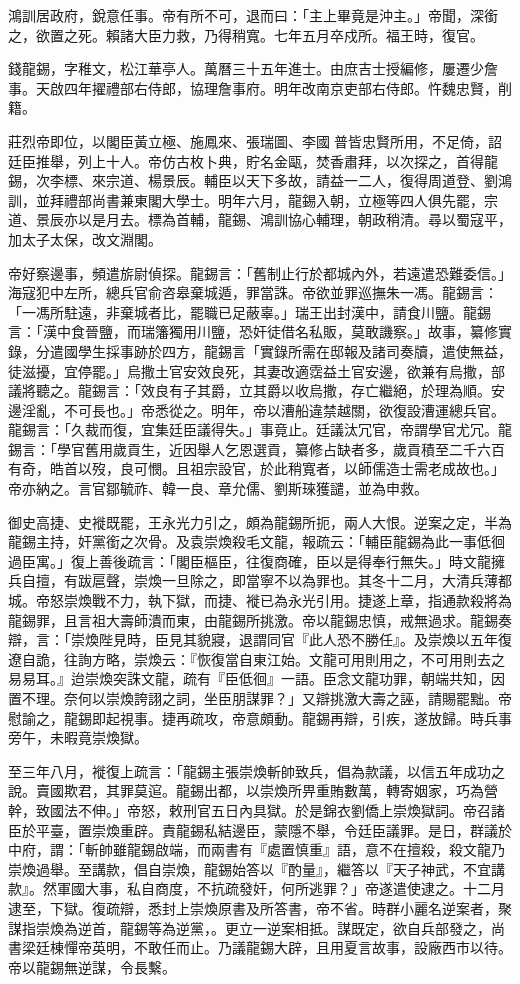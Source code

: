 \begin{pinyinscope}
鴻訓居政府，銳意任事。帝有所不可，退而曰：「主上畢竟是沖主。」帝聞，深銜之，欲置之死。賴諸大臣力救，乃得稍寬。七年五月卒戍所。福王時，復官。

錢龍錫，字稚文，松江華亭人。萬曆三十五年進士。由庶吉士授編修，屢遷少詹事。天啟四年擢禮部右侍郎，協理詹事府。明年改南京吏部右侍郎。忤魏忠賢，削籍。

莊烈帝即位，以閣臣黃立極、施鳳來、張瑞圖、李國普皆忠賢所用，不足倚，詔廷臣推舉，列上十人。帝仿古枚卜典，貯名金甌，焚香肅拜，以次探之，首得龍錫，次李標、來宗道、楊景辰。輔臣以天下多故，請益一二人，復得周道登、劉鴻訓，並拜禮部尚書兼東閣大學士。明年六月，龍錫入朝，立極等四人俱先罷，宗道、景辰亦以是月去。標為首輔，龍錫、鴻訓協心輔理，朝政稍清。尋以蜀寇平，加太子太保，改文淵閣。

帝好察邊事，頻遣旂尉偵探。龍錫言：「舊制止行於都城內外，若遠遣恐難委信。」海寇犯中左所，總兵官俞咨皋棄城遁，罪當誅。帝欲並罪巡撫朱一馮。龍錫言：「一馮所駐遠，非棄城者比，罷職已足蔽辜。」瑞王出封漢中，請食川鹽。龍錫言：「漢中食晉鹽，而瑞籓獨用川鹽，恐奸徒借名私販，莫敢譏察。」故事，纂修實錄，分遣國學生採事跡於四方，龍錫言「實錄所需在邸報及諸司奏牘，遣使無益，徒滋擾，宜停罷。」烏撒土官安效良死，其妻改適霑益土官安邊，欲兼有烏撒，部議將聽之。龍錫言：「效良有子其爵，立其爵以收烏撒，存亡繼絕，於理為順。安邊淫亂，不可長也。」帝悉從之。明年，帝以漕船違禁越關，欲復設漕運總兵官。龍錫言：「久裁而復，宜集廷臣議得失。」事竟止。廷議汰冗官，帝謂學官尤冗。龍錫言：「學官舊用歲貢生，近因舉人乞恩選貢，纂修占缺者多，歲貢積至二千六百有奇，皓首以歿，良可憫。且祖宗設官，於此稍寬者，以師儒造士需老成故也。」帝亦納之。言官鄒毓祚、韓一良、章允儒、劉斯琜獲譴，並為申救。

御史高捷、史褷既罷，王永光力引之，頗為龍錫所扼，兩人大恨。逆案之定，半為龍錫主持，奸黨銜之次骨。及袁崇煥殺毛文龍，報疏云：「輔臣龍錫為此一事低徊過臣寓。」復上善後疏言：「閣臣樞臣，往復商確，臣以是得奉行無失。」時文龍擁兵自擅，有跋扈聲，崇煥一旦除之，即當寧不以為罪也。其冬十二月，大清兵薄都城。帝怒崇煥戰不力，執下獄，而捷、褷已為永光引用。捷遂上章，指通款殺將為龍錫罪，且言祖大壽師潰而東，由龍錫所挑激。帝以龍錫忠慎，戒無過求。龍錫奏辯，言：「崇煥陛見時，臣見其貌寢，退謂同官『此人恐不勝任』。及崇煥以五年復遼自詭，往詢方略，崇煥云：『恢復當自東江始。文龍可用則用之，不可用則去之易易耳。』迨崇煥突誅文龍，疏有『臣低徊』一語。臣念文龍功罪，朝端共知，因置不理。奈何以崇煥誇詡之詞，坐臣朋謀罪？」又辯挑激大壽之誣，請賜罷黜。帝慰諭之，龍錫即起視事。捷再疏攻，帝意頗動。龍錫再辯，引疾，遂放歸。時兵事旁午，未暇竟崇煥獄。

至三年八月，褷復上疏言：「龍錫主張崇煥斬帥致兵，倡為款議，以信五年成功之說。賣國欺君，其罪莫逭。龍錫出都，以崇煥所畀重賄數萬，轉寄姻家，巧為營幹，致國法不伸。」帝怒，敕刑官五日內具獄。於是錦衣劉僑上崇煥獄詞。帝召諸臣於平臺，置崇煥重辟。責龍錫私結邊臣，蒙隱不舉，令廷臣議罪。是日，群議於中府，謂：「斬帥雖龍錫啟端，而兩書有『處置慎重』語，意不在擅殺，殺文龍乃崇煥過舉。至講款，倡自崇煥，龍錫始答以『酌量』，繼答以『天子神武，不宜講款』。然軍國大事，私自商度，不抗疏發奸，何所逃罪？」帝遂遣使逮之。十二月逮至，下獄。復疏辯，悉封上崇煥原書及所答書，帝不省。時群小麗名逆案者，聚謀指崇煥為逆首，龍錫等為逆黨，。更立一逆案相抵。謀既定，欲自兵部發之，尚書梁廷棟憚帝英明，不敢任而止。乃議龍錫大辟，且用夏言故事，設廠西市以待。帝以龍錫無逆謀，令長繫。


\end{pinyinscope}
